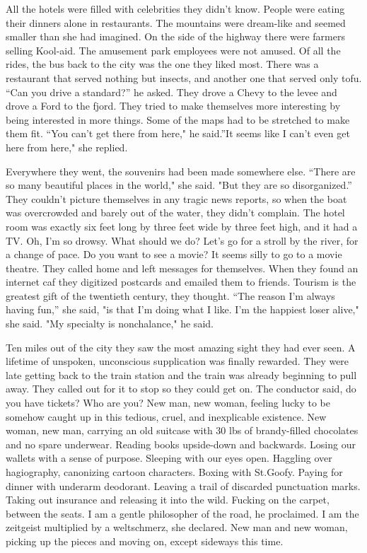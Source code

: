 \documentclass[
]{memoir}
\begin{document}
All the hotels were filled with celebrities they didn't know. People
were eating their dinners alone in restaurants. The mountains were
dream-like and seemed smaller than she had imagined. On the side of the
highway there were farmers selling Kool-aid. The amusement park
employees were not amused. Of all the rides, the bus back to the city
was the one they liked most. There was a restaurant that served nothing
but insects, and another one that served only tofu. ``Can you drive a
standard?'' he asked. They drove a Chevy to the levee and drove a Ford
to the fjord. They tried to make themselves more interesting by being
interested in more things. Some of the maps had to be stretched to make
them fit. ``You can't get there from here," he said.''It seems like I
can't even get here from here," she replied.

Everywhere they went, the souvenirs had been made somewhere else.
``There are so many beautiful places in the world," she said. "But they
are so disorganized.'' They couldn't picture themselves in any tragic
news reports, so when the boat was overcrowded and barely out of the
water, they didn't complain. The hotel room was exactly six feet long by
three feet wide by three feet high, and it had a TV. Oh, I'm so drowsy.
What should we do? Let's go for a stroll by the river, for a change of
pace. Do you want to see a movie? It seems silly to go to a movie
theatre. They called home and left messages for themselves. When they
found an internet caf they digitized postcards and emailed them to
friends. Tourism is the greatest gift of the twentieth century, they
thought. ``The reason I'm always having fun,'' she said, "is that I'm
doing what I like. I'm the happiest loser alive," she said. "My
specialty is nonchalance," he said.

Ten miles out of the city they saw the most amazing sight they had ever
seen. A lifetime of unspoken, unconscious supplication was finally
rewarded. They were late getting back to the train station and the train
was already beginning to pull away. They called out for it to stop so
they could get on. The conductor said, do you have tickets? Who are you?
New man, new woman, feeling lucky to be somehow caught up in this
tedious, cruel, and inexplicable existence. New woman, new man, carrying
an old suitcase with 30 lbs of brandy-filled chocolates and no spare
underwear. Reading books upside-down and backwards. Losing our wallets
with a sense of purpose. Sleeping with our eyes open. Haggling over
hagiography, canonizing cartoon characters. Boxing with St.Goofy. Paying
for dinner with underarm deodorant. Leaving a trail of discarded
punctuation marks. Taking out insurance and releasing it into the wild.
Fucking on the carpet, between the seats. I am a gentle philosopher of
the road, he proclaimed. I am the zeitgeist multiplied by a weltschmerz,
she declared. New man and new woman, picking up the pieces and moving
on, except sideways this time.
\end{document}
